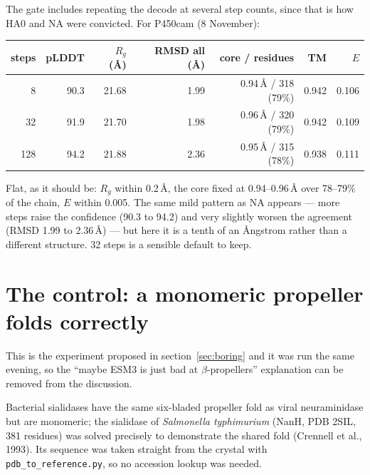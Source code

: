\documentclass[11pt,a4paper]{article}
\newcommand{\file}[1]{\texttt{#1}}
\begin{document}
The gate includes repeating the decode at several step counts, since that is how
HA0 and NA were convicted. For P450cam (8 November):

\begin{center}
\begin{tabular}{rrrrrrr}
\toprule
steps & pLDDT & $R_g$ (\AA) & RMSD all (\AA) & core / residues & TM & $E$ \\
\midrule
8   & 90.3 & 21.68 & 1.99 & 0.94\,\AA{} / 318 (79\%) & 0.942 & 0.106 \\
32  & 91.9 & 21.70 & 1.98 & 0.96\,\AA{} / 320 (79\%) & 0.942 & 0.109 \\
128 & 94.2 & 21.88 & 2.36 & 0.95\,\AA{} / 315 (78\%) & 0.938 & 0.111 \\
\bottomrule
\end{tabular}
\end{center}

Flat, as it should be: $R_g$ within 0.2\,\AA, the core fixed at 0.94--0.96\,\AA{}
over 78--79\% of the chain, $E$ within 0.005. The same mild pattern as NA appears
--- more steps raise the confidence (90.3 to 94.2) and very slightly worsen the
agreement (RMSD 1.99 to 2.36\,\AA) --- but here it is a tenth of an \AA ngstrom
rather than a different structure. 32 steps is a sensible default to keep.

\section{The control: a monomeric propeller folds correctly}\label{sec:nanh}

This is the experiment proposed in section~\ref{sec:boring} and it was run the
same evening, so the ``maybe ESM3 is just bad at $\beta$-propellers'' explanation
can be removed from the discussion.

Bacterial sialidases have the same six-bladed propeller fold as viral
neuraminidase but are monomeric; the sialidase of \emph{Salmonella typhimurium}
(NanH, PDB 2SIL, 381 residues) was solved precisely to demonstrate the shared
fold (Crennell et al., 1993). Its sequence was taken straight from the crystal
with \file{pdb\_to\_reference.py}, so no accession lookup was needed.
\end{document}
